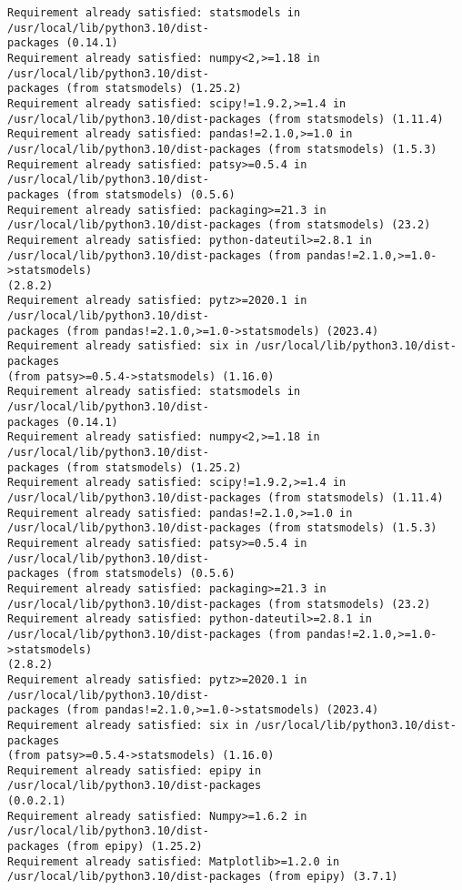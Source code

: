 \documentclass[11pt]{article}
\begin{document}
    \begin{Verbatim}[commandchars=\\\{\}]
Requirement already satisfied: statsmodels in /usr/local/lib/python3.10/dist-
packages (0.14.1)
Requirement already satisfied: numpy<2,>=1.18 in /usr/local/lib/python3.10/dist-
packages (from statsmodels) (1.25.2)
Requirement already satisfied: scipy!=1.9.2,>=1.4 in
/usr/local/lib/python3.10/dist-packages (from statsmodels) (1.11.4)
Requirement already satisfied: pandas!=2.1.0,>=1.0 in
/usr/local/lib/python3.10/dist-packages (from statsmodels) (1.5.3)
Requirement already satisfied: patsy>=0.5.4 in /usr/local/lib/python3.10/dist-
packages (from statsmodels) (0.5.6)
Requirement already satisfied: packaging>=21.3 in
/usr/local/lib/python3.10/dist-packages (from statsmodels) (23.2)
Requirement already satisfied: python-dateutil>=2.8.1 in
/usr/local/lib/python3.10/dist-packages (from pandas!=2.1.0,>=1.0->statsmodels)
(2.8.2)
Requirement already satisfied: pytz>=2020.1 in /usr/local/lib/python3.10/dist-
packages (from pandas!=2.1.0,>=1.0->statsmodels) (2023.4)
Requirement already satisfied: six in /usr/local/lib/python3.10/dist-packages
(from patsy>=0.5.4->statsmodels) (1.16.0)
Requirement already satisfied: statsmodels in /usr/local/lib/python3.10/dist-
packages (0.14.1)
Requirement already satisfied: numpy<2,>=1.18 in /usr/local/lib/python3.10/dist-
packages (from statsmodels) (1.25.2)
Requirement already satisfied: scipy!=1.9.2,>=1.4 in
/usr/local/lib/python3.10/dist-packages (from statsmodels) (1.11.4)
Requirement already satisfied: pandas!=2.1.0,>=1.0 in
/usr/local/lib/python3.10/dist-packages (from statsmodels) (1.5.3)
Requirement already satisfied: patsy>=0.5.4 in /usr/local/lib/python3.10/dist-
packages (from statsmodels) (0.5.6)
Requirement already satisfied: packaging>=21.3 in
/usr/local/lib/python3.10/dist-packages (from statsmodels) (23.2)
Requirement already satisfied: python-dateutil>=2.8.1 in
/usr/local/lib/python3.10/dist-packages (from pandas!=2.1.0,>=1.0->statsmodels)
(2.8.2)
Requirement already satisfied: pytz>=2020.1 in /usr/local/lib/python3.10/dist-
packages (from pandas!=2.1.0,>=1.0->statsmodels) (2023.4)
Requirement already satisfied: six in /usr/local/lib/python3.10/dist-packages
(from patsy>=0.5.4->statsmodels) (1.16.0)
Requirement already satisfied: epipy in /usr/local/lib/python3.10/dist-packages
(0.0.2.1)
Requirement already satisfied: Numpy>=1.6.2 in /usr/local/lib/python3.10/dist-
packages (from epipy) (1.25.2)
Requirement already satisfied: Matplotlib>=1.2.0 in
/usr/local/lib/python3.10/dist-packages (from epipy) (3.7.1)

\end{Verbatim}
\end{document}
